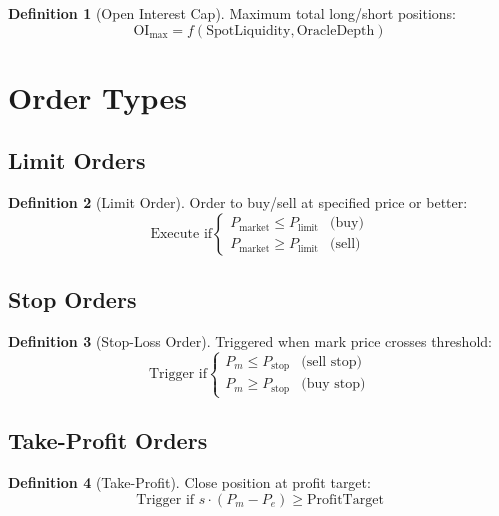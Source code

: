 \documentclass[11pt,a4paper]{article}
\theoremstyle{definition}
\newtheorem{definition}{Definition}
\begin{document}
\begin{definition}[Open Interest Cap]
Maximum total long/short positions:
\begin{equation}
\text{OI}_{\max} = f(\text{SpotLiquidity}, \text{OracleDepth})
\end{equation}
\end{definition}

\section{Order Types}

\subsection{Limit Orders}

\begin{definition}[Limit Order]
Order to buy/sell at specified price or better:
\begin{equation}
\text{Execute if} \begin{cases}
P_{\text{market}} \leq P_{\text{limit}} & \text{(buy)} \\
P_{\text{market}} \geq P_{\text{limit}} & \text{(sell)}
\end{cases}
\end{equation}
\end{definition}

\subsection{Stop Orders}

\begin{definition}[Stop-Loss Order]
Triggered when mark price crosses threshold:
\begin{equation}
\text{Trigger if} \begin{cases}
P_m \leq P_{\text{stop}} & \text{(sell stop)} \\
P_m \geq P_{\text{stop}} & \text{(buy stop)}
\end{cases}
\end{equation}
\end{definition}

\subsection{Take-Profit Orders}

\begin{definition}[Take-Profit]
Close position at profit target:
\begin{equation}
\text{Trigger if } s \cdot (P_m - P_e) \geq \text{ProfitTarget}
\end{equation}
\end{definition}
\end{document}
